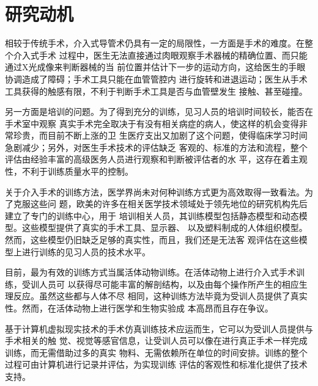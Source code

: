 \section{研究动机}
\label{sec1-2}

相较于传统手术，介入式导管术仍具有一定的局限性，一方面是手术的难度。在整个介入式手术
过程中，医生无法直接通过肉眼观察手术器械的精确位置、而只能通过X光成像来判断器械的当
前位置并估计下一步的运动方向，这给医生的手眼协调造成了障碍；手术工具只能在血管管腔内
进行旋转和进退运动；医生从手术工具获得的触感有限，不利于判断手术工具是否与血管壁发生
接触、甚至碰撞。

另一方面是培训的问题。为了得到充分的训练，见习人员的培训时间较长，能否在手术室中观察
真实手术完全取决于有没有相关病症的病人，使这样的机会变得非常珍贵，而目前不断上涨的卫
生医疗支出又加剧了这个问题，使得临床学习时间急剧减少；另外，对医生手术技术的评估缺乏
客观的、标准的方法和流程，整个评估由经验丰富的高级医务人员进行观察和判断被评估者的水
平，这存在着主观性，不利于训练质量水平的控制。

关于介入手术的训练方法，医学界尚未对何种训练方式更为高效取得一致看法。为了克服这些问
题，欧美的许多在相关医学技术领域处于领先地位的研究机构先后建立了专门的训练中心，用于
培训相关人员，其训练模型包括静态模型和动态模型。这些模型提供了真实的手术工具、显示器、
以及塑料制成的人体组织模型。然而，这些模型仍旧缺乏足够的真实性，而且，我们还是无法客
观评估在这些模型上进行训练的见习人员的技术水平。

目前，最为有效的训练方式当属活体动物训练。在活体动物上进行介入式手术训练，受训人员可
以获得尽可能丰富的解剖结构，以及由每个操作所产生的相应生理反应。虽然这些都与人体不尽
相同，这种训练方法毕竟为受训人员提供了真实性。然而，在活体动物上进行医学和生物实验成
本高昂而且存在争议。

基于计算机虚拟现实技术的手术仿真训练技术应运而生，它可以为受训人员提供与手术相关的触
觉、视觉等感官信息，让受训人员可以像在进行真正手术一样完成训练，而无需借助过多的真实
物料、无需依赖所在单位的时间安排。训练的整个过程可由计算机进行记录并评估，为实现训练
评估的客观性和标准化提供了技术支持。



